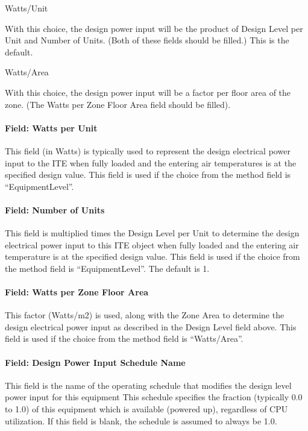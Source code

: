 Watts/Unit

With this choice, the design power input will be the product of Design Level per Unit and Number of Units. (Both of these fields should be filled.) This is the default.

Watts/Area

With this choice, the design power input will be a factor per floor area of the zone. (The Watts per Zone Floor Area field should be filled).

\paragraph{Field: Watts per Unit}\label{field-watts-per-unit}

This field (in Watts) is typically used to represent the design electrical power input to the ITE when fully loaded and the entering air temperatures is at the specified design value. This field is used if the choice from the method field is ``EquipmentLevel''.

\paragraph{Field: Number of Units}\label{field-number-of-units}

This field is multiplied times the Design Level per Unit to determine the design electrical power input to this ITE object when fully loaded and the entering air temperature is at the specified design value. This field is used if the choice from the method field is ``EquipmentLevel''. The default is 1.

\paragraph{Field: Watts per Zone Floor Area}\label{field-watts-per-zone-floor-area-2}

This factor (Watts/m2) is used, along with the Zone Area to determine the design electrical power input as described in the Design Level field above. This field is used if the choice from the method field is ``Watts/Area''.

\paragraph{Field: Design Power Input Schedule Name}\label{field-design-power-input-schedule-name}

This field is the name of the operating schedule that modifies the design level power input for this equipment This schedule specifies the fraction (typically 0.0 to 1.0) of this equipment which is available (powered up), regardless of CPU utilization. If this field is blank, the schedule is assumed to always be 1.0.

